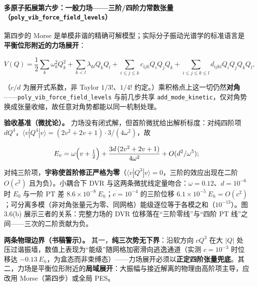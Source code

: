 \documentclass[
]{ctexbook}
\begin{document}
\hypertarget{ux591aux539fux5b50ux62d3ux5c55ux7b2cux516dux6b65ux4e00ux822cux529bux573aux4e09ux9636ux56dbux9636ux529bux5e38ux6570ux5f20ux91cfpoly_vib_force_field_levels}{%
\paragraph{\texorpdfstring{多原子拓展第六步：一般力场------三阶/四阶力常数张量（\texttt{poly\_vib\_force\_field\_levels}）}{多原子拓展第六步：一般力场------三阶/四阶力常数张量（poly\_vib\_force\_field\_levels）}}\label{ux591aux539fux5b50ux62d3ux5c55ux7b2cux516dux6b65ux4e00ux822cux529bux573aux4e09ux9636ux56dbux9636ux529bux5e38ux6570ux5f20ux91cfpoly_vib_force_field_levels}}

第四步的 Morse
是单模非谐的精确可解模型；实际分子振动光谱学的标准语言是\textbf{平衡位形附近的力场展开}：

\[V(Q)=\frac12\sum_k\omega_k^{2}Q_k^{2}+\sum_{k<l}\lambda_{kl}Q_kQ_l
+\sum_{i\le j\le k}c_{ijk}Q_iQ_jQ_k+\sum_{i\le j\le k\le l}d_{ijkl}Q_iQ_jQ_kQ_l,\]

（\(c/d\) 为展开式系数，非 Taylor \(1/3!\)、\(1/4!\)
约定。）乘积格点上这一切仍然\textbf{对角}------\texttt{poly\_vib\_force\_field\_levels}
与前几步共享
\texttt{add\_mode\_kinetic}，仅对角势换成张量收缩，故任意对角势都能以同一机制处理。

\textbf{验收基准（微扰论）。}
力场没有闭式解，但首阶微扰给出解析标度：对纯四阶项
\(dQ^4\)，\(\langle v|Q^4|v\rangle=(2v^2+2v+1)\cdot3/(4\omega^{2})\)，故

\[E_v=\omega\Bigl(v+\tfrac12\Bigr)+\frac{3d\,(2v^{2}+2v+1)}{4\omega^{2}}+O(d^{2}/\omega^{5});\]

对纯三阶项，\textbf{宇称使首阶修正严格为零}（\(\langle v|Q^3|v\rangle=0\)，三阶的效应出现在二阶
\(O(c^{2})\) 且为负）。小耦合下 DVR
与这两条微扰线定量吻合：\(\omega=0.12\)、\(d=10^{-6}\) 时 \(E_0\) 与一阶
PT 差 \(8.6\times10^{-8}\ E_h\)；\(c=10^{-4}\) 的三阶位移
\(6.1\times10^{-5}\ E_h=O(c^{2})\)；可分离多模（非对角张量元为零、同网格）能级逐位等于各模之和（\(10^{-13}\)）。图
3.6(b) 展示三者的关系：完整力场的 DVR 位移落在``三阶零线''与``四阶 PT
线''之间------三次的二阶贡献为负。

\textbf{两条物理边界（书稿警示）。}
其一，\textbf{纯三次势无下界}：沿软方向 \(cQ^3\) 在大 \(|Q|\)
处压过谐振墙，数值上表现为``能级''随网格加密滑向逃逸通道（实测
\(c=10^{-3}\) 时位移达
\(-0.13\ E_h\)，为盒态而非束缚态）------力场展开必须以\textbf{正定四阶张量兜底}。其二，力场是平衡位形附近的\textbf{局域展开}：大振幅与接近解离的物理由高阶项主导，应改用
Morse（第四步）或全局 PES。
\end{document}
